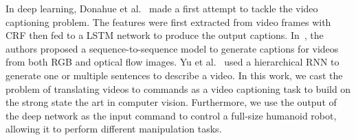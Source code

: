 In deep learning, Donahue et al.~\cite{Donahue2014} made a first attempt to tackle the video captioning problem. The features were first extracted from video frames with CRF then fed to a LSTM network to produce the output captions. In~\cite{Venugopalan2016}, the authors proposed a sequence-to-sequence model to generate captions for videos from both RGB and optical flow images. Yu et al.~\cite{Haonan2016} used a hierarchical RNN to generate one or multiple sentences to describe a video. In this work, we cast the problem of translating videos to commands as a video captioning task to build on the strong state  the art in computer vision. Furthermore, we use the output of the deep network as the input command to control a full-size humanoid robot, allowing it to perform different manipulation tasks.












